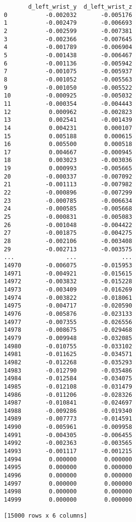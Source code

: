 \documentclass[11pt]{article}
\begin{document}
\begin{verbatim}
       d_left_wrist_y  d_left_wrist_z  
0           -0.002032       -0.005176  
1           -0.002479       -0.006693  
2           -0.002599       -0.007381  
3           -0.002366       -0.007645  
4           -0.001789       -0.006904  
5           -0.001438       -0.006467  
6           -0.001136       -0.005942  
7           -0.001075       -0.005937  
8           -0.001052       -0.005563  
9           -0.001050       -0.005522  
10          -0.000925       -0.005032  
11          -0.000354       -0.004443  
12           0.000962       -0.002823  
13           0.002541       -0.001439  
14           0.004231        0.000107  
15           0.005188        0.000615  
16           0.005500        0.000518  
17           0.004667       -0.000945  
18           0.003023       -0.003036  
19           0.000993       -0.005665  
20          -0.000337       -0.007092  
21          -0.001113       -0.007982  
22          -0.000896       -0.007299  
23          -0.000785       -0.006634  
24          -0.000585       -0.005668  
25          -0.000831       -0.005083  
26          -0.001048       -0.004422  
27          -0.001875       -0.004275  
28          -0.002106       -0.003408  
29          -0.002713       -0.003575  
...               ...             ...  
14970       -0.006075       -0.015953  
14971       -0.004921       -0.015615  
14972       -0.003832       -0.015228  
14973       -0.003409       -0.016269  
14974       -0.003822       -0.018061  
14975       -0.004717       -0.020590  
14976       -0.005876       -0.023133  
14977       -0.007355       -0.026556  
14978       -0.008675       -0.029468  
14979       -0.009948       -0.032085  
14980       -0.010755       -0.033102  
14981       -0.011625       -0.034571  
14982       -0.012268       -0.035293  
14983       -0.012790       -0.035486  
14984       -0.012584       -0.034075  
14985       -0.012108       -0.031479  
14986       -0.011206       -0.028326  
14987       -0.010841       -0.024697  
14988       -0.009286       -0.019340  
14989       -0.007773       -0.014591  
14990       -0.005961       -0.009958  
14991       -0.004305       -0.006455  
14992       -0.002363       -0.003565  
14993       -0.001117       -0.001215  
14994        0.000000        0.000000  
14995        0.000000        0.000000  
14996        0.000000        0.000000  
14997        0.000000        0.000000  
14998        0.000000        0.000000  
14999        0.000000        0.000000  

[15000 rows x 6 columns]
    \end{verbatim}
\end{document}
